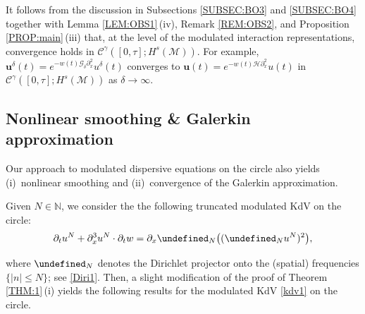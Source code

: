 \documentclass[letterpaper, 11pt,  reqno]{amsart}
\newcommand{\1}{\hspace{0.5mm}\text{I}\hspace{0.5mm}}
\newcommand{\noi}{\noindent}
\let\P= \undefined
\newcommand{\P}{\mathbf{P}}
\renewcommand{\H}{\mathcal{H}}
\newcommand{\CC}{\mathcal{C}}
\newcommand{\dl}{\delta}
\newcommand{\g}{\gamma}
\newcommand{\dx}{\partial_x}
\newcommand{\dt}{\partial_t}
\newcommand{\Gdl}{\mathcal{G}_{\dl} }
\newcommand{\M}{\mathcal{M}}
\newcommand{\N}{\mathbb{N}}
\newcommand{\uu}{\mathbf{u}}
\numberwithin{equation}{section}
\numberwithin{theorem}{section}
\begin{document}
It follows from 
the discussion in 
Subsections \ref{SUBSEC:BO3}
and \ref{SUBSEC:BO4}
together with 
Lemma \ref{LEM:OBS1}\,(iv), 
Remark \ref{REM:OBS2}, 
and 
Proposition \ref{PROP:main}\,(iii)
that, at the level of the modulated interaction representations, 
convergence holds
in  $\CC^\g([0, \tau]; H^s(\M))$.
For example, 
$\uu^\dl(t) = e^{-  w(t) \Gdl \dx^2} u^\dl(t)$
converges
to $\uu(t) = e^{ -w(t) \H \dx^2} u(t)$
in  $\CC^\g([0, \tau]; H^s(\M))$
as $\dl \to \infty$.






\subsection{Nonlinear smoothing \& Galerkin approximation}


Our approach to  modulated dispersive equations on the circle
also yields
(i)~nonlinear smoothing 
and (ii)~convergence of the Galerkin approximation.







Given $N \in \N$, 
we consider the 
the following truncated modulated KdV on the circle:
\begin{equation}
\label{kdv1x}
\dt u^N+  \dx^3 u^N \cdot \dt w =\dx \P_N\big((\P_Nu^N)^2\big), 
\end{equation}

\noi
where   $\P_N$ denotes  the Dirichlet projector onto the (spatial) frequencies 
$\{|n| \leq N\}$; see \eqref{Diri1}.
Then, a slight modification of the proof of Theorem \ref{THM:1}\,(i)
yields  the following results
for the modulated KdV \eqref{kdv1} on the circle.
\end{document}
